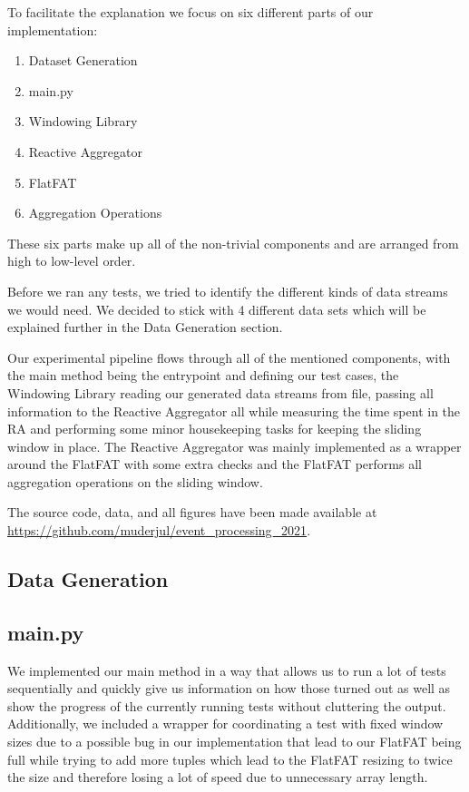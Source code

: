 To facilitate the explanation we focus on six different parts of our implementation:
\begin{enumerate}
  \item Dataset Generation
  \item main.py
  \item Windowing Library
  \item Reactive Aggregator
  \item FlatFAT
  \item Aggregation Operations
\end{enumerate}

These six parts make up all of the non-trivial components and are arranged from high
to low-level order.

Before we ran any tests, we tried to identify the different kinds of data streams we
would need. We decided to stick with 4 different data sets which will be explained further
in the Data Generation section.

Our experimental pipeline flows through all of the mentioned components, with the main
method being the entrypoint and defining our test cases, the Windowing Library reading
our generated data streams from file, passing all information to the Reactive Aggregator
all while measuring the time spent in the RA and performing some minor housekeeping tasks
for keeping the sliding window in place.
The Reactive Aggregator was mainly implemented as a wrapper around the FlatFAT with some extra checks
and the FlatFAT performs all aggregation operations on the sliding window.

The source code, data, and all figures have been made available at \url{https://github.com/muderjul/event\_processing\_2021}.

\subsection{Data Generation}
\label{sec:dg}




\subsection{main.py}
We implemented our main method in a way that allows us to run a lot of tests sequentially
and quickly give us information on how those turned out as well as show the progress of the
currently running tests without cluttering the output.
Additionally, we included a wrapper for coordinating a test with fixed window sizes due
to a possible bug in our implementation that lead to our FlatFAT being full while trying
to add more tuples which lead to the FlatFAT resizing to twice the size and therefore
losing a lot of speed due to unnecessary array length.

